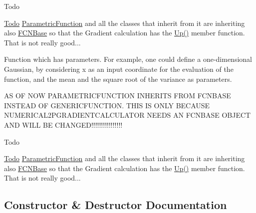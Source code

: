 \begin{DoxyRefDesc}{Todo}
\item[\mbox{\hyperlink{todo__todo000012}{Todo}}]\mbox{\hyperlink{classROOT_1_1Minuit2_1_1ParametricFunction}{Parametric\+Function}} and all the classes that inherit from it are inheriting also \mbox{\hyperlink{classROOT_1_1Minuit2_1_1FCNBase}{F\+C\+N\+Base}} so that the Gradient calculation has the \mbox{\hyperlink{classROOT_1_1Minuit2_1_1FCNBase_a04ef08ddad92ce8d89d498efbe021c39}{Up()}} member function. That is not really good...\end{DoxyRefDesc}


Function which has parameters. For example, one could define a one-\/dimensional Gaussian, by considering x as an input coordinate for the evaluation of the function, and the mean and the square root of the variance as parameters. 

AS OF N\+OW P\+A\+R\+A\+M\+E\+T\+R\+I\+C\+F\+U\+N\+C\+T\+I\+ON I\+N\+H\+E\+R\+I\+TS F\+R\+OM F\+C\+N\+B\+A\+SE I\+N\+S\+T\+E\+AD OF G\+E\+N\+E\+R\+I\+C\+F\+U\+N\+C\+T\+I\+ON. T\+H\+IS IS O\+N\+LY B\+E\+C\+A\+U\+SE N\+U\+M\+E\+R\+I\+C\+A\+L2\+P\+G\+R\+A\+D\+I\+E\+N\+T\+C\+A\+L\+C\+U\+L\+A\+T\+OR N\+E\+E\+DS AN F\+C\+N\+B\+A\+SE O\+B\+J\+E\+CT A\+ND W\+I\+LL BE C\+H\+A\+N\+G\+E\+D!!!!!!!!!!!!!!!!

\begin{DoxyRefDesc}{Todo}
\item[\mbox{\hyperlink{todo__todo000024}{Todo}}]\mbox{\hyperlink{classROOT_1_1Minuit2_1_1ParametricFunction}{Parametric\+Function}} and all the classes that inherit from it are inheriting also \mbox{\hyperlink{classROOT_1_1Minuit2_1_1FCNBase}{F\+C\+N\+Base}} so that the Gradient calculation has the \mbox{\hyperlink{classROOT_1_1Minuit2_1_1FCNBase_a04ef08ddad92ce8d89d498efbe021c39}{Up()}} member function. That is not really good...\end{DoxyRefDesc}


\subsection{Constructor \& Destructor Documentation}
\mbox{\label{classROOT_1_1Minuit2_1_1ParametricFunction_a5abce16504b1532a38da1409afdaa71d}} 
